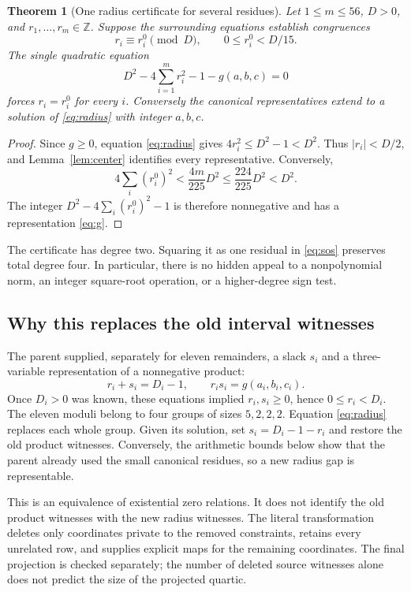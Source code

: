 \documentclass[11pt]{article}
\newcommand{\Z}{\mathbb Z}
\newtheorem{theorem}{Theorem}[section]
\theoremstyle{remark}
\numberwithin{equation}{section}
\begin{document}
\begin{theorem}[One radius certificate for several residues]\label{thm:radius}
Let $1\le m\le56$, $D>0$, and $r_1,\ldots,r_m\in\Z$. Suppose the surrounding equations establish congruences
\[
r_i\equiv r_i^0\pmod D,\qquad 0\le r_i^0<D/15.
\]
The single quadratic equation
\begin{equation}\label{eq:radius}
D^2-4\sum_{i=1}^m r_i^2-1-g(a,b,c)=0
\end{equation}
forces $r_i=r_i^0$ for every $i$. Conversely the canonical representatives extend to a solution of \eqref{eq:radius} with integer $a,b,c$.
\end{theorem}
\begin{proof}
Since $g\ge0$, equation \eqref{eq:radius} gives $4r_i^2\le D^2-1<D^2$. Thus $|r_i|<D/2$, and Lemma~\ref{lem:center} identifies every representative. Conversely,
\[
4\sum_i(r_i^0)^2<\frac{4m}{225}D^2\le\frac{224}{225}D^2<D^2.
\]
The integer $D^2-4\sum_i(r_i^0)^2-1$ is therefore nonnegative and has a representation \eqref{eq:g}.
\end{proof}

The certificate has degree two. Squaring it as one residual in \eqref{eq:sos} preserves total degree four. In particular, there is no hidden appeal to a nonpolynomial norm, an integer square-root operation, or a higher-degree sign test.

\subsection{Why this replaces the old interval witnesses}

The parent supplied, separately for eleven remainders, a slack $s_i$ and a three-variable representation of a nonnegative product:
\[
r_i+s_i=D_i-1,\qquad r_i s_i=g(a_i,b_i,c_i).
\]
Once $D_i>0$ was known, these equations implied $r_i,s_i\ge0$, hence $0\le r_i<D_i$. The eleven moduli belong to four groups of sizes $5,2,2,2$. Equation \eqref{eq:radius} replaces each whole group. Given its solution, set $s_i=D_i-1-r_i$ and restore the old product witnesses. Conversely, the arithmetic bounds below show that the parent already used the small canonical residues, so a new radius gap is representable.

This is an equivalence of existential zero relations. It does not identify the old product witnesses with the new radius witnesses. The literal transformation deletes only coordinates private to the removed constraints, retains every unrelated row, and supplies explicit maps for the remaining coordinates. The final projection is checked separately; the number of deleted source witnesses alone does not predict the size of the projected quartic.
\end{document}
